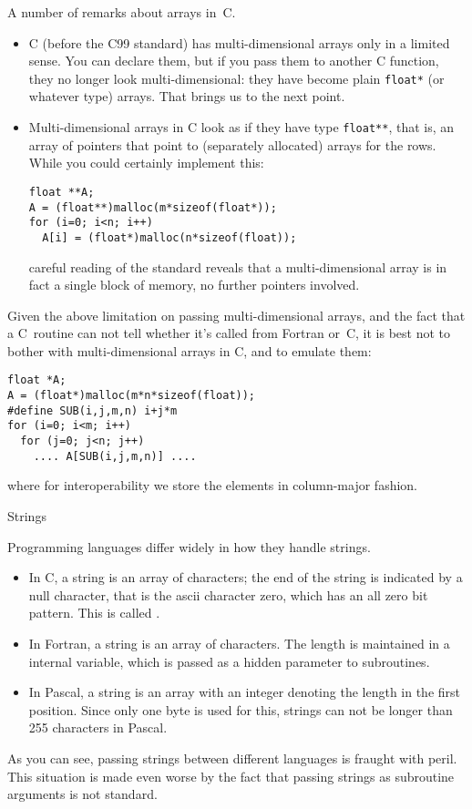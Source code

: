 A number of remarks about arrays in~C.
\begin{itemize}
\item C (before the C99 standard) has multi-dimensional arrays only in
  a limited sense. You can declare them, but if you pass them to another
  C function, they no longer look multi-dimensional: they have become
  plain \texttt{float*} (or whatever type) arrays. That brings us to
  the next point.
\item Multi-dimensional arrays in C look as if they have type
  \texttt{float**}, that is, an array of pointers that point to
  (separately allocated) arrays for the rows. While you could
  certainly implement this:
\begin{verbatim}
float **A;
A = (float**)malloc(m*sizeof(float*));
for (i=0; i<n; i++)
  A[i] = (float*)malloc(n*sizeof(float));
\end{verbatim}
  careful reading of the standard reveals that a multi-dimensional
  array is in fact a single block of memory, no further pointers
  involved.
\end{itemize}
Given the above limitation on passing multi-dimensional arrays, and
the fact that a C~routine can not tell whether it's called from
Fortran or~C, it is best not to bother with multi-dimensional arrays
in C, and to emulate them:
\begin{verbatim}
float *A;
A = (float*)malloc(m*n*sizeof(float));
#define SUB(i,j,m,n) i+j*m
for (i=0; i<m; i++)
  for (j=0; j<n; j++)
    .... A[SUB(i,j,m,n)] ....
\end{verbatim}
where for interoperability we store the elements in column-major fashion.


 {Strings}

Programming languages differ widely in how they handle strings. 
\begin{itemize}
\item In C, a string is an array of characters; the end of the string
  is indicated by a null character, that is the ascii character zero,
  which has an all zero bit pattern. This is called .
\item In Fortran, a string is an array of characters. The length is
  maintained in a internal variable, which is passed as a hidden
  parameter to subroutines.
\item In Pascal, a string is an array with an integer denoting the
  length in the first position. Since only one byte is used for this,
  strings can not be longer than 255 characters in Pascal.
\end{itemize}
As you can see, passing strings between different languages is fraught
with peril. This situation is made even worse by the fact that passing
strings as subroutine arguments is not standard.


